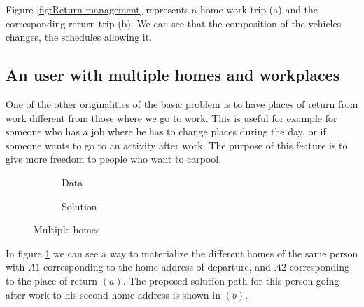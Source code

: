 \documentclass[12pt, a4paper,twoside]{memoir}
\begin{document}
	Figure \ref{fig:Return management} represents a home-work trip (a) and the corresponding return trip (b). We can see that the composition of the vehicles changes, the schedules allowing it.
	
	\subsection*{An user with multiple homes and workplaces}
	One of the other originalities of the basic problem is to have places of return from work different from those where we go to work. This is useful for example for someone who has a job where he has to change places during the day, or if someone wants to go to an activity after work. The purpose of this feature is to give more freedom to people who want to carpool.
	
	\begin{figure}[H]
		\centering
		\begin{subfigure}{.5\textwidth}
			\centering
			\caption{ Data }
		\end{subfigure}%
		\begin{subfigure}{.5\textwidth}
			\centering
			\caption{ Solution }
		\end{subfigure}
		\caption{Multiple homes}
		\label{fig:Several homes}
	\end{figure}
	
	In figure \ref{fig:Several homes} we can see a way to materialize the different homes of the same person with $A1$ corresponding to the home address of departure, and $A2$ corresponding to the place of return $(a)$. The proposed solution path for this person going after work to his second home address is shown in $(b)$.
	
\end{document}
